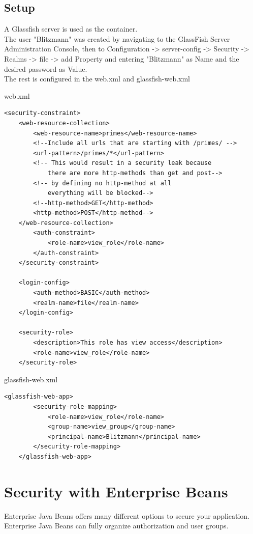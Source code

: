\documentclass[12pt,a4paper]{report}
\begin{document}
\section{Setup}
A Glassfish server is used as the container.\\
The user "Blitzmann" was created by navigating to the GlassFish Server Administration Console, then to Configuration -> server-config -> Security -> Realms -> file -> add Property and entering "Blitzmann" as Name and the desired password as Value.\\
The rest is configured in the web.xml and glassfish-web.xml
\begin{bclogo}[couleur=yellow!15,arrondi=0.1,logo=\bccrayon, ombre = true]{web.xml}
	\begin{lstlisting}[style=XML]
    <security-constraint>
    <web-resource-collection>
	    <web-resource-name>primes</web-resource-name>
	    <!--Include all urls that are starting with /primes/ -->
	    <url-pattern>/primes/*</url-pattern>
	    <!-- This would result in a security leak because 
		    there are more http-methods than get and post-->
	    <!-- by defining no http-method at all 
		    everything will be blocked-->
	    <!--http-method>GET</http-method>
	    <http-method>POST</http-method-->
    </web-resource-collection>
	    <auth-constraint>
		    <role-name>view_role</role-name>
	    </auth-constraint>
    </security-constraint>
    
    <login-config>
	    <auth-method>BASIC</auth-method>
	    <realm-name>file</realm-name>
    </login-config>
    
    <security-role>
        <description>This role has view access</description>
        <role-name>view_role</role-name>
    </security-role>
	\end{lstlisting}
\end{bclogo}
\begin{bclogo}[couleur=yellow!15,arrondi=0.1,logo=\bccrayon, ombre = true]{glassfish-web.xml}
	\begin{lstlisting}[style=XML]
	<glassfish-web-app>
		<security-role-mapping>
			<role-name>view_role</role-name>
			<group-name>view_group</group-name>
			<principal-name>Blitzmann</principal-name>
		</security-role-mapping>
	</glassfish-web-app>
	\end{lstlisting}
\end{bclogo}

\chapter{Security with Enterprise Beans}
Enterprise Java Beans offers many different options to secure your application. Enterprise Java Beans can fully organize authorization and user groups.
\end{document}
